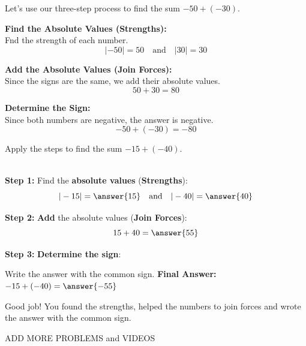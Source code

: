 \documentclass{ximera}[font=12pt]
\begin{document}
\begin{example} Let's use our three-step process to find the sum $-50 + (-30).$

\begin{description}[style=multiline, leftmargin=5em, font=\bfseries]
    \item[Step 1] \textbf{Find the Absolute Values (Strengths):} \\
    Fnd the strength of each number.
    \[ |-50| = 50 \quad \text{and} \quad |30| = 30 \]

    \item[Step 2] \textbf{Add the Absolute Values (Join Forces):} \\
    Since the signs are the same, we add their absolute values.
    \[ 50 + 30 = 80 \]

    \item[Step 3] \textbf{Determine the Sign:} \\
    Since both numbers are negative, the answer is negative.
    \[ -50 + (-30) = -80 \]
\end{description}

\end{example}


\begin{problem}
    Apply the steps to find the sum $-15 + (-40).$

    ~ \\[3em]
    \textbf{Step 1:} Find the \textbf{absolute values} (\textbf{Strengths}):
    \[ |-15| = \answer{15} \quad \text{and} \quad |-40| = \answer{40} \]

    \begin{problem}
    \textbf{Step 2:} \textbf{Add} the absolute values (\textbf{Join Forces}):
    \[ 15 + 40 = \answer{55} \]

    \begin{problem}
    \textbf{Step 3:} \textbf{Determine the sign}:

    Write the answer with the common sign.
    \textbf{Final Answer:} $-15 + (-40) = \answer{-55}$

    \begin{feedback}[correct]
        Good job! You found the strengths, helped the numbers to join forces and wrote the answer with the common sign.
    \end{feedback}

\end{problem}
\end{problem}
\end{problem}



ADD MORE PROBLEMS and VIDEOS
\end{document}
